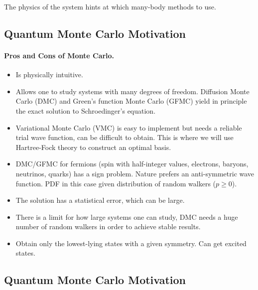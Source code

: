 \documentclass[%
twoside,                 %
final,                   %
10pt]{article}
\begin{document}
\noindent
The physics of the system hints at which many-body methods to use.





\subsection*{Quantum Monte Carlo Motivation}

\paragraph{Pros and Cons of Monte Carlo.}
\begin{itemize}
\item Is physically intuitive.

\item Allows one to study systems with many degrees of freedom. Diffusion Monte Carlo (DMC) and Green's function Monte Carlo (GFMC) yield in principle the exact solution to Schroedinger's equation.

\item Variational Monte Carlo (VMC) is easy  to implement but needs a reliable trial wave function, can be difficult to obtain.  This is where we will use Hartree-Fock theory to construct an optimal basis.

\item DMC/GFMC for fermions (spin with half-integer values, electrons, baryons, neutrinos, quarks)  has a sign problem. Nature prefers an anti-symmetric wave function. PDF in this case given distribution of random walkers ($p\ge 0$).

\item The solution has a statistical error, which can be large. 

\item There is a limit for how large systems one can study, DMC needs a huge number of random walkers in order to achieve stable results. 

\item Obtain only the lowest-lying states with a given symmetry. Can get excited states.
\end{itemize}

\noindent





\subsection*{Quantum Monte Carlo Motivation}
\end{document}
